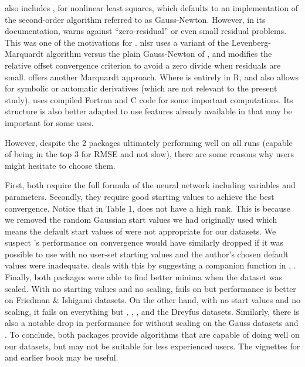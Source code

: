 also includes , for nonlinear least squares, which
defaults to an implementation of the second-order algorithm referred to
as Gauss-Newton. However, in its documentation,  warns against
``zero-residual'' or even small residual problems. \citep[Section
6.4.1]{Nash-nlpor14} This was one of the motivations for 
\citep{R-nlsr}. nlsr uses a variant \citep{jn77ima} of the
Levenberg-Marquardt algorithm versus the plain Gauss-Newton of
, and modifies the relative offset convergence criterion to
avoid a zero divide when residuals are small. 
\citep{minpack.lm} offers another Marquardt approach. Where
 is entirely in \textsf{R}, and also allows for symbolic
or automatic derivatives (which are not relevant to the present study),
 uses compiled \textsf{Fortran} and \textsf{C} code
for some important computations. Its structure is also better adapted to
use features already available in  that may be important for
some uses.

However, despite the 2 packages ultimately performing well on all runs
(capable of being in the top 3 for RMSE and not slow), there are some
reasons why users might hesitate to choose them.

First, both require the full formula of the neural network including
variables and parameters. Secondly, they require good starting values to
achieve the best convergence. Notice that in Table 1, 
does not have a high rank. This is because we removed the random
Gaussian start values we had originally used which means the default
start values of  were not appropriate for our datasets.
We suspect 's performance on convergence would have
similarly dropped if it was possible to use  with no
user-set starting values and the author's chosen default values were
inadequate.  deals with this by suggesting a companion
function in , . Finally, both packages
were able to find better minima when the dataset was scaled. With no
starting values and no scaling,  fails on
 but performance is better on Friedman \& Ishigami
datasets. On the other hand, with no start values and no scaling, it
fails on everything but , ,
, and the Dreyfus datasets. Similarly, there is also a
notable drop in performance for  without scaling on the
Gauss datasets and . To conclude, both packages provide
algorithms that are capable of doing well on our datasets, but may not
be suitable for less experienced users. The vignettes for 
and earlier book \citep{Nash-nlpor14} may be useful.

